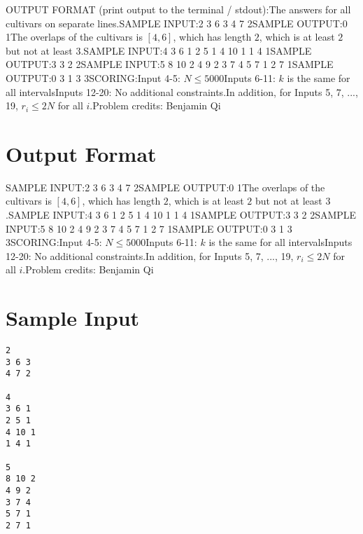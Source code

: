 \documentclass[12pt]{article}
\begin{document}
OUTPUT FORMAT (print output to the terminal / stdout):The answers for all cultivars on separate lines.SAMPLE INPUT:2
3 6 3
4 7 2SAMPLE OUTPUT:0
1The overlaps of the cultivars is $[4,6]$, which has length $2$, which is at
least $2$ but not at least $3$.SAMPLE INPUT:4
3 6 1
2 5 1
4 10 1
1 4 1SAMPLE OUTPUT:3
3
2
2SAMPLE INPUT:5
8 10 2
4 9 2
3 7 4
5 7 1
2 7 1SAMPLE OUTPUT:0
3
1
3
3SCORING:Input 4-5: $N \leq 5000$Inputs 6-11: $k$ is the same for all intervalsInputs 12-20: No additional constraints.In addition, for Inputs 5, 7, ..., 19, $r_i \leq 2N$ for all $i$.Problem credits: Benjamin Qi

\section*{Output Format}
SAMPLE INPUT:2
3 6 3
4 7 2SAMPLE OUTPUT:0
1The overlaps of the cultivars is $[4,6]$, which has length $2$, which is at
least $2$ but not at least $3$.SAMPLE INPUT:4
3 6 1
2 5 1
4 10 1
1 4 1SAMPLE OUTPUT:3
3
2
2SAMPLE INPUT:5
8 10 2
4 9 2
3 7 4
5 7 1
2 7 1SAMPLE OUTPUT:0
3
1
3
3SCORING:Input 4-5: $N \leq 5000$Inputs 6-11: $k$ is the same for all intervalsInputs 12-20: No additional constraints.In addition, for Inputs 5, 7, ..., 19, $r_i \leq 2N$ for all $i$.Problem credits: Benjamin Qi

\section*{Sample Input}
\begin{verbatim}
2
3 6 3
4 7 2

4
3 6 1
2 5 1
4 10 1
1 4 1

5
8 10 2
4 9 2
3 7 4
5 7 1
2 7 1
\end{verbatim}
\end{document}
